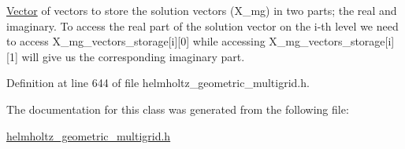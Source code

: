 \hyperlink{classoomph_1_1Vector}{Vector} of vectors to store the solution vectors (X\+\_\+mg) in two parts; the real and imaginary. To access the real part of the solution vector on the i-\/th level we need to access X\+\_\+mg\+\_\+vectors\+\_\+storage\mbox{[}i\mbox{]}\mbox{[}0\mbox{]} while accessing X\+\_\+mg\+\_\+vectors\+\_\+storage\mbox{[}i\mbox{]}\mbox{[}1\mbox{]} will give us the corresponding imaginary part. 



Definition at line 644 of file helmholtz\+\_\+geometric\+\_\+multigrid.\+h.



The documentation for this class was generated from the following file\+:\begin{DoxyCompactItemize}
\item 
\hyperlink{helmholtz__geometric__multigrid_8h}{helmholtz\+\_\+geometric\+\_\+multigrid.\+h}\end{DoxyCompactItemize}
